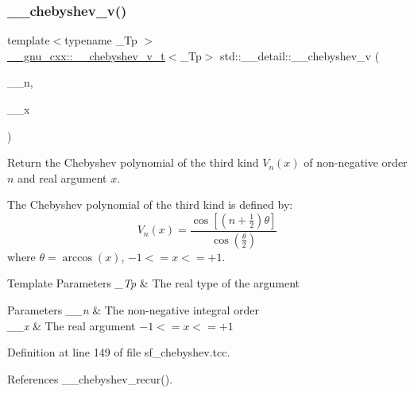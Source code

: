 \subsubsection{\texorpdfstring{\+\_\+\+\_\+chebyshev\+\_\+v()}{\_\_chebyshev\_v()}}
{\footnotesize\ttfamily template$<$typename \+\_\+\+Tp $>$ \\
\hyperlink{struct____gnu__cxx_1_1____chebyshev__v__t}{\+\_\+\+\_\+gnu\+\_\+cxx\+::\+\_\+\+\_\+chebyshev\+\_\+v\+\_\+t}$<$\+\_\+\+Tp$>$ std\+::\+\_\+\+\_\+detail\+::\+\_\+\+\_\+chebyshev\+\_\+v (\begin{DoxyParamCaption}\item[{unsigned int}]{\+\_\+\+\_\+n,  }\item[{\+\_\+\+Tp}]{\+\_\+\+\_\+x }\end{DoxyParamCaption})}

Return the Chebyshev polynomial of the third kind $ V_n(x) $ of non-\/negative order $ n $ and real argument $ x $.

The Chebyshev polynomial of the third kind is defined by\+: \[ V_n(x) = \frac{\cos \left[ \left(n+\frac{1}{2}\right)\theta \right]} {\cos \left(\frac{\theta}{2}\right)} \] where $ \theta = \arccos(x) $, $ -1 <= x <= +1 $.


\begin{DoxyTemplParams}{Template Parameters}
{\em \+\_\+\+Tp} & The real type of the argument \\
\hline
\end{DoxyTemplParams}

\begin{DoxyParams}{Parameters}
{\em \+\_\+\+\_\+n} & The non-\/negative integral order \\
\hline
{\em \+\_\+\+\_\+x} & The real argument $ -1 <= x <= +1 $ \\
\hline
\end{DoxyParams}


Definition at line 149 of file sf\+\_\+chebyshev.\+tcc.



References \+\_\+\+\_\+chebyshev\+\_\+recur().

\mbox{\label{namespacestd_1_1____detail_ab2a0ec347e56c0fae435c8da507c578c}} 
